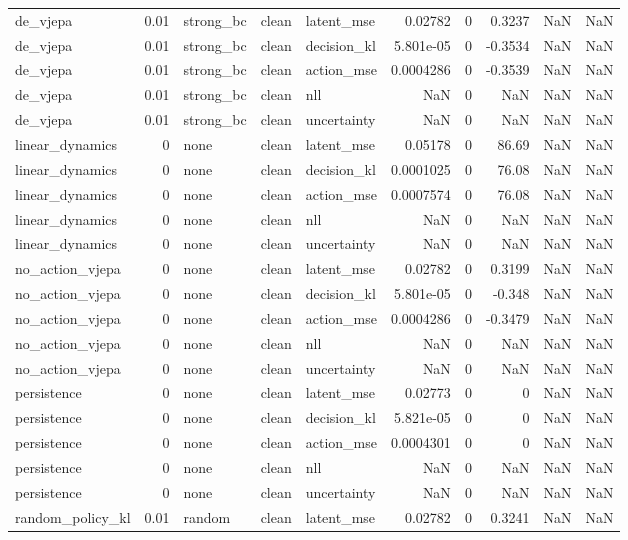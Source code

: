 \begin{tabular}{lrlllrrrrr}
de\_vjepa & 0.01 & strong\_bc & clean & latent\_mse & 0.02782 & 0 & 0.3237 & NaN & NaN \\
de\_vjepa & 0.01 & strong\_bc & clean & decision\_kl & 5.801e-05 & 0 & -0.3534 & NaN & NaN \\
de\_vjepa & 0.01 & strong\_bc & clean & action\_mse & 0.0004286 & 0 & -0.3539 & NaN & NaN \\
de\_vjepa & 0.01 & strong\_bc & clean & nll & NaN & 0 & NaN & NaN & NaN \\
de\_vjepa & 0.01 & strong\_bc & clean & uncertainty & NaN & 0 & NaN & NaN & NaN \\
linear\_dynamics & 0 & none & clean & latent\_mse & 0.05178 & 0 & 86.69 & NaN & NaN \\
linear\_dynamics & 0 & none & clean & decision\_kl & 0.0001025 & 0 & 76.08 & NaN & NaN \\
linear\_dynamics & 0 & none & clean & action\_mse & 0.0007574 & 0 & 76.08 & NaN & NaN \\
linear\_dynamics & 0 & none & clean & nll & NaN & 0 & NaN & NaN & NaN \\
linear\_dynamics & 0 & none & clean & uncertainty & NaN & 0 & NaN & NaN & NaN \\
no\_action\_vjepa & 0 & none & clean & latent\_mse & 0.02782 & 0 & 0.3199 & NaN & NaN \\
no\_action\_vjepa & 0 & none & clean & decision\_kl & 5.801e-05 & 0 & -0.348 & NaN & NaN \\
no\_action\_vjepa & 0 & none & clean & action\_mse & 0.0004286 & 0 & -0.3479 & NaN & NaN \\
no\_action\_vjepa & 0 & none & clean & nll & NaN & 0 & NaN & NaN & NaN \\
no\_action\_vjepa & 0 & none & clean & uncertainty & NaN & 0 & NaN & NaN & NaN \\
persistence & 0 & none & clean & latent\_mse & 0.02773 & 0 & 0 & NaN & NaN \\
persistence & 0 & none & clean & decision\_kl & 5.821e-05 & 0 & 0 & NaN & NaN \\
persistence & 0 & none & clean & action\_mse & 0.0004301 & 0 & 0 & NaN & NaN \\
persistence & 0 & none & clean & nll & NaN & 0 & NaN & NaN & NaN \\
persistence & 0 & none & clean & uncertainty & NaN & 0 & NaN & NaN & NaN \\
random\_policy\_kl & 0.01 & random & clean & latent\_mse & 0.02782 & 0 & 0.3241 & NaN & NaN \\

\end{tabular}
